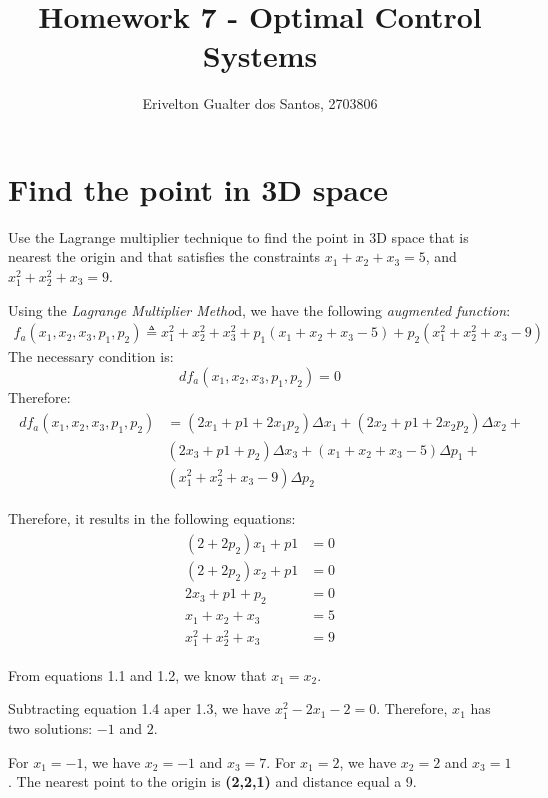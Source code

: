 \documentclass{article}
\begin{document}
\title{Homework 7 - Optimal Control Systems}
\author{Erivelton Gualter dos Santos, 2703806}
\date{}

\maketitle 

\section{Find the point in 3D space}

Use the Lagrange multiplier technique to find the point in 3D space that is nearest the origin and that satisfies the constraints $x_1+x_2+x_3=5$, and $x_1^2+x_2^2+x_3=9$.

Using the \textit{Lagrange Multiplier Metho}d, we have the following \textit{augmented function}:
\begin{eqnarray*}
f_a(x_1,x_2,x_3,p_1,p_2)  \triangleq x_1^2+x_2^2+x_3^2 + p_1(x_1+x_2+x_3-5) + p_2(x_1^2+x_2^2+x_3-9)
\end{eqnarray*}
The necessary condition is: 
$$ df_a(x_1,x_2,x_3,p_1,p_2) = 0$$
Therefore:
\begin{eqnarray*}
\begin{split}
df_a(x_1,x_2,x_3,p_1,p_2) &= (2x_1+p1+2x_1p_2)\Delta x_1 + (2x_2+p1+2x_2p_2)\Delta x_2 + \\
& (2x_3+p1+p_2)\Delta x_3 + (x_1+x_2+x_3-5)\Delta p_1 + \\
& (x_1^2+x_2^2+x_3-9)\Delta p_2
\end{split}
\end{eqnarray*}

Therefore, it results in the following equations:
\begin{eqnarray}
\begin{split}
(2+2p_2)x_1 + p1 &= 0 \\
(2+2p_2)x_2 + p1 &= 0 \\
2x_3+p1+p_2 &= 0 \\
x_1+x_2+x_3 &= 5 \\
x_1^2+x_2^2+x_3 &= 9
\end{split}
\end{eqnarray}

From equations 1.1 and 1.2, we know that $x_1 = x_2$.

Subtracting equation 1.4 aper 1.3, we have $x_1^2-2x_1-2=0$. Therefore, $x_1$ has two solutions: $-1$ and $2$.

For $x_1 = -1$, we have $x_2 = -1$ and $x_3 = 7$. For $x_1 = 2$, we have $x_2 = 2$ and $x_3 = 1$. The nearest point to the origin is \textbf{(2,2,1)} and distance equal a 9.
\end{document}
